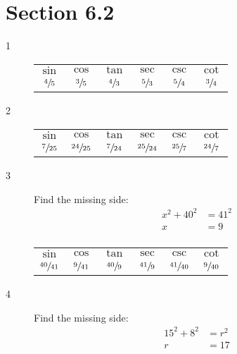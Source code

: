 \documentclass{exam}
\begin{document}
  \ifprintanswers

    \section{Section 6.2}
    \begin{description}

      \item[1] 
        \begin{tabular}[H]{cccccc}
          \toprule
          $\sin$         & $\cos$         & $\tan$         & $\sec$         & $\csc$         & $\cot$ \\
          $\sfrac{4}{5}$ & $\sfrac{3}{5}$ & $\sfrac{4}{3}$ & $\sfrac{5}{3}$ & $\sfrac{5}{4}$ & $\sfrac{3}{4}$ \\
          \bottomrule
        \end{tabular}

      \item[2] 
        \begin{tabular}[H]{cccccc}
          \toprule
          $\sin$          & $\cos$           & $\tan$          & $\sec$           & $\csc$          & $\cot$ \\
          $\sfrac{7}{25}$ & $\sfrac{24}{25}$ & $\sfrac{7}{24}$ & $\sfrac{25}{24}$ & $\sfrac{25}{7}$ & $\sfrac{24}{7}$ \\
          \bottomrule
        \end{tabular}

      \item[3] 
        Find the missing side:
        \begin{align*}
          x^2 + 40^2 & = 41^2 \\
          x          & = 9 \\
        \end{align*}

        \begin{tabular}[H]{cccccc}
          \toprule
          $\sin$          & $\cos$           & $\tan$          & $\sec$           & $\csc$          & $\cot$ \\
          $\sfrac{40}{41}$ & $\sfrac{9}{41}$ & $\sfrac{40}{9}$ & $\sfrac{41}{9}$ & $\sfrac{41}{40}$ & $\sfrac{9}{40}$ \\
          \bottomrule
        \end{tabular}

      \item[4] 
        Find the missing side:
        \begin{align*}
          15^2 + 8^2 & = r^2 \\
          r          & = 17 \\
        \end{align*}


\end{description}
\end{document}
